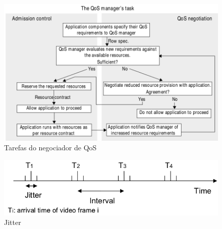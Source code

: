 \documentclass[]{beamer}
\begin{document}
\begin{frame}
  \begin{figure}[hbtp]
   \caption{Tarefas do negociador de QoS}
   \begin{center}
    \includegraphics[scale=0.33]{negociador_qos.png}
   \end{center}
  \end{figure}
\end{frame}






\begin{frame}
   \begin{figure}[hbtp]
  \caption{Jitter\cite{Mingyang:2002}}
  \begin{center}
   \includegraphics[scale=0.48]{jitter2.png}
  \end{center}
 \end{figure}
\end{frame}
\end{document}
